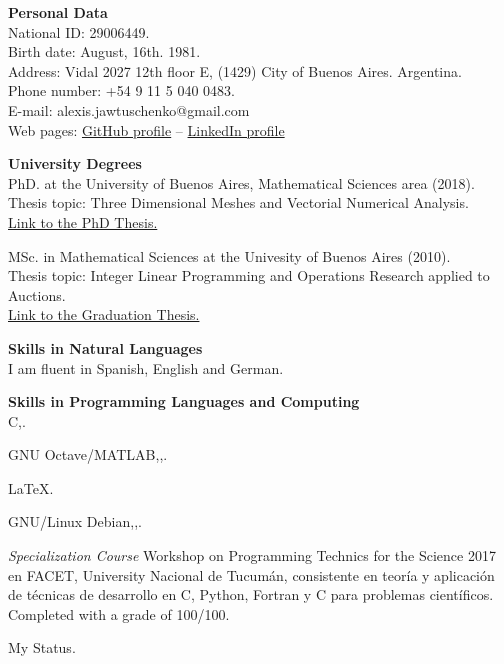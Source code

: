 \textbf{Personal Data}\\[6pt]
National ID: 29006449.\\
Birth date: August, 16th. 1981.\\
Address: Vidal 2027 12th floor E, (1429) City of Buenos Aires. Argentina.\\
Phone number: +54 9 11 5 040 0483.\\
E-mail: alexis.jawtuschenko@gmail.com\\
Web pages: \href{https://github.com/alexisjawtu}{{\color{blue}GitHub profile}}
-- \href{https://www.linkedin.com/in/alexis-jawtuschenko/}{{\color{blue}LinkedIn profile}}

\textbf{University Degrees}\\[6pt]
PhD. at the University of Buenos Aires, Mathematical Sciences area (2018).\\
Thesis topic: Three Dimensional Meshes and Vectorial Numerical Analysis.\\
\href{https://cms.dm.uba.ar/academico/carreras/doctorado/thesisJawtuschenko.pdf}
{{\color{blue}Link to the PhD Thesis.}}

MSc. in Mathematical Sciences at the Univesity of Buenos Aires (2010).\\
Thesis topic: Integer Linear Programming and Operations Research applied to Auctions.\\
\href{https://cms.dm.uba.ar/academico/carreras/licenciatura/tesis/2010/Jawtuschenko_Alexis.pdf}
{{\color{blue}Link to the Graduation Thesis.}}

\textbf{Skills in Natural Languages}\\[6pt]
I am fluent in Spanish, English and German.

\textbf{Skills in Programming Languages and Computing}\\[6pt]
C\masmas,\;.

{GNU Octave/MATLAB},\;,\;.

{LaTeX}.

{GNU/Linux Debian},\;,\;.

\emph{Specialization Course}
Workshop on Programming Technics for the Science 2017 en FACET, 
University Nacional de Tucum\'an, consistente en teor\'ia y aplicaci\'on de t\'ecnicas 
de desarrollo en C, Python, Fortran y C\masmas\,\,para problemas cient\'ificos.
Completed with a grade of 100/100.

My \href{https://projecteuler.net/profile/alexisj.png}
        {\color{blue}{Project Euler}}
Status.
	

